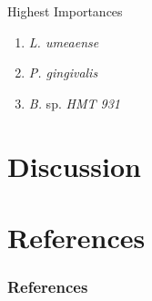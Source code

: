 \documentclass{beamer}
\begin{document}
\begin{frame}[allowframebreaks]
        \begin{block}{Highest Importances}
            \begin{enumerate}
                \item \textit{L. umeaense}
                \item \textit{P. gingivalis}
                \item \textit{B.} sp. \textit{HMT 931}
            \end{enumerate}
        \end{block}
    \end{frame}

    \section{Discussion}

    \section{References}
   	\begin{frame}[allowframebreaks]
        \frametitle{References}
        
        
    \end{frame}
\end{document}

